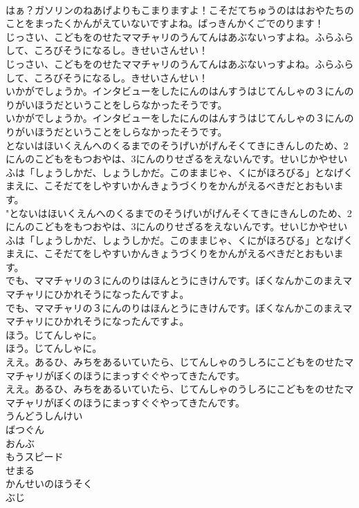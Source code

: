 \documentclass[8pt]{extreport}
\begin{document}
\begin{CJK}{UTF8}{min}
\\	はぁ？ガソリンのねあげよりもこまりますよ！こそだてちゅうのははおやたちのことをまったくかんがえていないですよね。ばっきんかくごでのります！ 
\\	じっさい、こどもをのせたママチャリのうんてんはあぶないっすよね。ふらふらして、ころびそうになるし。きせいさんせい！	
\\	じっさい、こどもをのせたママチャリのうんてんはあぶないっすよね。ふらふらして、ころびそうになるし。きせいさんせい！ 
\\	いかがでしょうか。インタビューをしたにんのはんすうはじてんしゃの３にんのりがいほうだということをしらなかったそうです。	
\\	いかがでしょうか。インタビューをしたにんのはんすうはじてんしゃの３にんのりがいほうだということをしらなかったそうです。 
\\	とないはほいくえんへのくるまでのそうげいがげんそくてきにきんしのため、2にんのこどもをもつおやは、3にんのりせざるをえないんです。せいじかやせいふは「しょうしかだ、しょうしかだ。このままじゃ、くにがほろびる」となげくまえに、こそだてをしやすいかんきょうづくりをかんがえるべきだとおもいます。	
\\	"とないはほいくえんへのくるまでのそうげいがげんそくてきにきんしのため、2にんのこどもをもつおやは、3にんのりせざるをえないんです。せいじかやせいふは「しょうしかだ、しょうしかだ。このままじゃ、くにがほろびる」となげくまえに、こそだてをしやすいかんきょうづくりをかんがえるべきだとおもいます。 
\\	でも、ママチャリの３にんのりはほんとうにきけんです。ぼくなんかこのまえママチャリにひかれそうになったんですよ。	
\\	でも、ママチャリの３にんのりはほんとうにきけんです。ぼくなんかこのまえママチャリにひかれそうになったんですよ。 
\\	ほう。じてんしゃに。	
\\	ほう。じてんしゃに。 
\\	ええ。あるひ、みちをあるいていたら、じてんしゃのうしろにこどもをのせたママチャリがぼくのほうにまっすぐぐやってきたんです。	
\\	ええ。あるひ、みちをあるいていたら、じてんしゃのうしろにこどもをのせたママチャリがぼくのほうにまっすぐぐやってきたんです。 
\\	うんどうしんけい
\\	ばつぐん
\\	おんぶ
\\	もうスピード
\\	せまる
\\	かんせいのほうそく
\\	ぶじ

\end{CJK}
\end{document}
